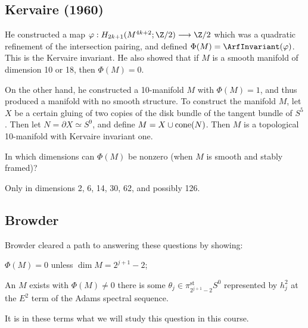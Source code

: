 \documentclass[11pt]{article}
\begin{document}
\subsection*{Kervaire (1960)}He constructed a map $\phi:H_{2k+1}(M^{4k+2};\Z/2)\to\Z/2$ which was a quadratic refinement of the intersection pairing, and defined $\Phi(M)=\ArfInvariant(\phi)$. This is the Kervaire invariant. He also showed that if $M$ is a smooth manifold of dimension 10 or 18, then $\Phi(M)=0$.

On the other hand, he constructed a 10-manifold $M$ with $\Phi(M)=1$, and thus produced a manifold with no smooth structure.
To construct the manifold $M$, let $X$ be a certain gluing of two copies of the disk bundle of the tangent bundle of $S^5$. Then let $N=\partial X\simeq S^9$, and define $M=X\cup\operatorname{cone}(N)$. Then $M$ is a topological 10-manifold with Kervaire invariant one.
\begin{question}
In which dimensions can $\Phi(M)$ be nonzero (when $M$ is smooth and stably framed)?
\end{question}
\begin{answer}
Only in dimensions 2, 6, 14, 30, 62, and possibly 126. 
\end{answer}
\subsection*{Browder}
Browder cleared a path to answering these questions by showing:
\begin{itemise}
\item $\Phi(M)=0$ unless $\dim M=2^{j+1}-2$;
\item An $M$ exists with $\Phi(M)\neq0$ \Iff there is some $\theta_j\in\pi_{2^{j+1}-2}^\text{st}S^0$ represented by $h_j^2$ at the $E^2$ term of the Adams spectral sequence.
\end{itemise}
It is in these terms what we will study this question in this course.
\end{document}
